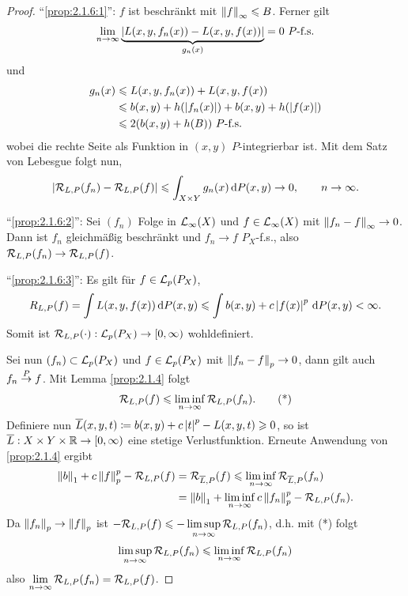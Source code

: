 \begin{proof}
``\ref{prop:2.1.6:1}'': $f$ ist beschränkt mit $\left\|f\right\|_\infty \leqslant B$. Ferner
gilt
\begin{align*}
\lim\limits_{n\to\infty} \underbrace{\left|L(x,y,f_n(x))-L(x,y,f(x))\right|}_{g_n(x)}
= 0\ P\text{-f.s.}
\end{align*}
und
\begin{align*}
g_n(x) &\leqslant L(x,y,f_n(x)) + L(x,y,f(x))\\
&\leqslant b(x,y) + h(\left|f_n(x)\right|) + b(x,y)+ h(\left|f(x)\right|)\\
&\leqslant 2(b(x,y) + h(B))\ P\text{-f.s.}
\end{align*}
wobei die rechte Seite als Funktion in $(x,y)$ $P$-integrierbar ist. Mit dem
Satz von Lebesgue folgt nun,
\begin{align*}
\left|\mathcal{R}_{L,P}(f_n)-\mathcal{R}_{L,P}(f)\right| \leqslant \int_{X\times Y} g_n(x) \,\mathrm{d} P(x,y) \to
0,\qquad n\to\infty.
\end{align*}

``\ref{prop:2.1.6:2}'': Sei $(f_n)$ Folge in $\mathcal{L}_\infty(X)$ und
$f\in\mathcal{L}_\infty(X)$ mit $\left\|f_n-f\right\|_\infty \to 0$. Dann ist $f_n$ gleichmäßig
beschränkt und $f_n\to f$ $P_X$-f.s., also $\mathcal{R}_{L,P}(f_n)\to
\mathcal{R}_{L,P}(f)$.

``\ref{prop:2.1.6:3}'': Es gilt für $f\in\mathcal{L}_p(P_X)$,
\begin{align*}
R_{L,P}(f) = \int L(x,y,f(x))\,\mathrm{d} P(x,y)
\leqslant \int b(x,y) + c\left|f(x)\right|^p \,\mathrm{d} P(x,y) < \infty.
\end{align*}
Somit ist $\mathcal{R}_{L,P}(\cdot): \mathcal{L}_p(P_X)\to [0,\infty)$ wohldefiniert.

Sei nun $(f_n)\subset \mathcal{L}_p(P_X)$ und $f\in\mathcal{L}_p(P_X)$ mit $\left\|f_n-f\right\|_p\to
0$, dann gilt auch $f_n\overset{P}{\to} f$. Mit Lemma \ref{prop:2.1.4} folgt
\begin{align*}
\mathcal{R}_{L,P}(f) \leqslant \liminf_{n\to\infty} \mathcal{R}_{L,P}(f_n).\tag{*}
\end{align*}
Definiere nun ${\overline{L}}(x,y,t)\coloneq b(x,y) + c\left|t\right|^p - L(x,y,t) \geqslant 0$, so ist
${\overline{L}}:X\times Y\times \mathbb{R} \to [0,\infty)$ eine stetige Verlustfunktion.
Erneute Anwendung von \ref{prop:2.1.4} ergibt
\begin{align*}
\left\|b\right\|_1 +c\left\|f\right\|_p^p
- \mathcal{R}_{L,P}(f) &= 
\mathcal{R}_{{\overline{L}},P}(f) \leqslant \liminf_{n\to\infty} \mathcal{R}_{{\overline{L}},P}(f_n)\\
&= \left\|b\right\|_1 + \liminf_{n\to\infty} c\left\|f_n\right\|_p^p - \mathcal{R}_{L,P}(f_n).
\end{align*}
Da $\left\|f_n\right\|_p\to \left\|f\right\|_p$ ist $-\mathcal{R}_{L,P}(f)\leqslant -
\limsup\limits_{n\to\infty} \mathcal{R}_{L,P}(f_n)$, d.h. mit (*) folgt
\begin{align*}
\limsup_{n\to\infty} \mathcal{R}_{L,P}(f_n) \leqslant \liminf_{n\to\infty} \mathcal{R}_{L,P}(f_n)
\end{align*}
also $\lim\limits_{n\to\infty} \mathcal{R}_{L,P}(f_n) = \mathcal{R}_{L,P}(f)$.\qedhere
\end{proof}

